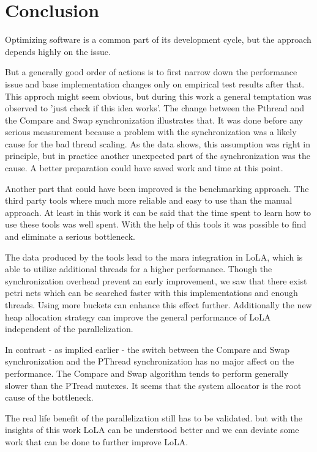 \chapter{Conclusion}
Optimizing software is a common part of its development cycle, but the approach depends highly on the issue.

But a generally good order of actions is to first narrow down the performance issue and base implementation changes only on empirical test results after that. This approch might seem obvious, but during this work a general temptation was observed to 'just check if this idea works'. The change between the Pthread and the Compare and Swap synchronization illustrates that. It was done before any serious measurement because a problem with the synchronization was a likely cause for the bad thread scaling. As the data shows, this assumption was right in principle, but in practice another unexpected part of the synchronization was the cause. A better preparation could have saved work and time at this point.

Another part that could have been improved is the benchmarking approach. The third party tools where much more reliable and easy to use than the manual approach. At least in this work it can be said that the time spent to learn how to use these tools was well spent. With the help of this tools it was possible to find and eliminate a serious bottleneck.

The data produced by the tools lead to the mara integration in LoLA, which is able to utilize additional threads for a higher performance. Though the synchronization overhead prevent an early improvement, we saw that there exist petri nets which can be searched faster with this implementations and enough threads. Using more buckets can enhance this effect further. Additionally the new heap allocation strategy can improve the general performance of LoLA independent of the parallelization.

In contrast - as implied earlier - the switch between the Compare and Swap synchronization and the PThread synchronization has no major affect on the performance. The Compare and Swap algorithm tends to perform generally slower than the PTread mutexes. It seems that the system allocator is the root cause of the bottleneck.

The real life benefit of the parallelization still has to be validated. but with the insights of this work LoLA can be understood better and we can deviate some work that can be done to further improve LoLA. 